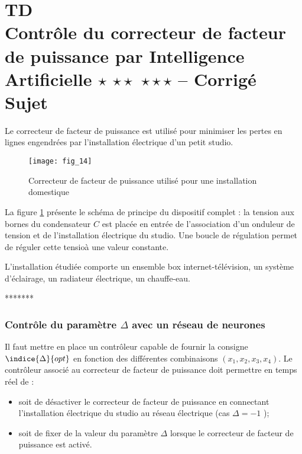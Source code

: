 \chapter*{TD  \\ 
Contrôle du correcteur de facteur de puissance par Intelligence Artificielle \ifnormal $\star$ \else \fi \ifdifficile $\star\star$ \else \fi \iftdifficile $\star\star\star$ \else \fi -- \ifprof Corrigé \else Sujet \fi}

\iflivret {} \else
\ifprof  {} \else \fi
\fi

\setcounter{question}{0}

Le correcteur de facteur de puissance est utilisé pour minimiser les pertes en lignes engendrées par l'installation électrique d'un petit studio. 

\begin{figure}[!h]
\centering
\texttt{[image: fig\_14]}
\caption{ Correcteur de facteur de puissance utilisé pour une installation domestique\label{Cy_07_ch_02_td_01_fig_14}}
\end{figure}
La figure \ref{Cy_07_ch_02_td_01_fig_14} présente le schéma de principe du dispositif complet : la tension aux bornes du condensateur $C$ est placée en entrée de l'association d'un onduleur de tension et de l'installation électrique du studio. Une boucle de régulation permet de réguler cette tensioà une valeur constante. 

L'installation étudiée comporte un ensemble box internet-télévision, un système d'éclairage, un radiateur électrique, un chauffe-eau.

*******

\subsection*{Contrôle du paramètre $\Delta$ avec un réseau de neurones}
Il faut mettre en place un contrôleur capable de fournir la consigne $\indice{\Delta}{opt}$ en fonction des différentes combinaisons $\left(x_1, x_2, x_3, x_4 \right)$. Le contrôleur associé au correcteur de facteur de puissance doit permettre en temps réel de : 
\begin{itemize}
\item soit de désactiver le correcteur de facteur de puissance en connectant l'installation électrique du studio au réseau électrique (cas $\Delta = -1$ );
\item soit de fixer de la valeur du paramètre $\Delta$ lorsque le correcteur de facteur de puissance est activé.
\end{itemize}

